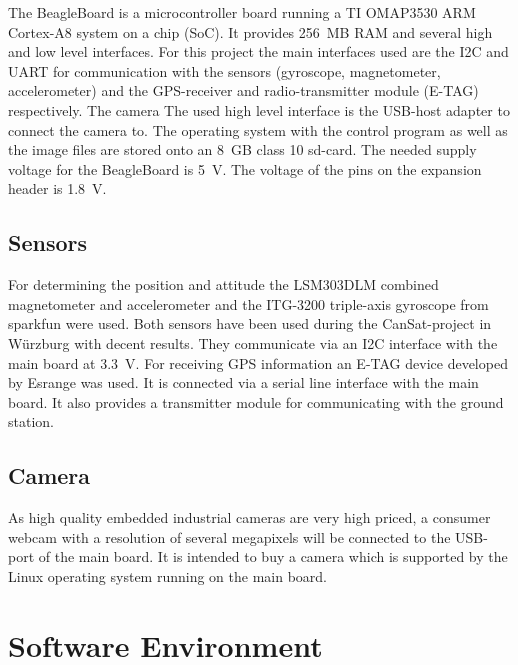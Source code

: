 \pagebreak

\noindent
The BeagleBoard is a microcontroller board running a TI OMAP3530 ARM Cortex-A8
system on a chip (SoC). It provides 256~MB RAM and several high and low level
interfaces. For this project the main interfaces used are the I2C and UART for
communication with the sensors (gyroscope, magnetometer, accelerometer) and
the GPS-receiver and radio-transmitter module (E-TAG) respectively. The camera
The used high level interface is the USB-host adapter to connect the camera
to. The operating system with the control program as well as the image files
are stored onto an 8~GB class 10 sd-card. The needed supply voltage for the BeagleBoard is 5~V. The voltage of the pins on the expansion header is 1.8~V.

\subsection*{Sensors}

For determining the position and attitude the LSM303DLM \cite{LSM303:datasheet}
combined magnetometer and accelerometer and the ITG-3200 triple-axis gyroscope
\cite{ITG-3200:datasheet} from sparkfun were used. Both sensors have been used
during the CanSat-project in Würzburg with decent results. They communicate
via an I2C interface with the main board at 3.3~V. For receiving GPS
information an E-TAG device developed by Esrange was
used. It is connected via a serial line interface with the main board. It also
provides a transmitter module for communicating with the ground station.

\subsection*{Camera}

As high quality embedded industrial cameras are very high priced, a consumer
webcam with a resolution of several megapixels will be connected to the USB-port
of the main board. It is intended to buy a camera which is supported by the
Linux operating system running on the main board.


\FloatBarrier
\section{Software Environment}

